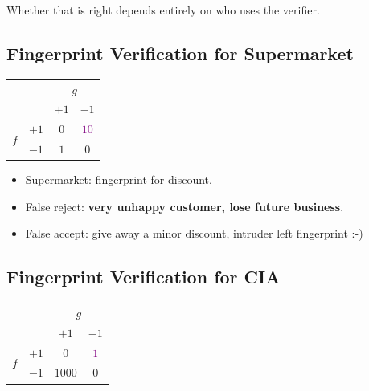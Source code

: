 Whether that is right depends entirely on who uses the verifier.

\subsection{Fingerprint Verification for Supermarket}

\begin{center}
    \solidrules
    \begin{tabular}{@{}cc|cc@{}}
        \toprule
        & & \multicolumn{2}{c}{\(g\)}\\
        & & \(+1\) & \(-1\)\\
        \midrule
        \multirow{2}{*}{\(f\)} & \(+1\) & \textcolor{black!45}{\(0\)}
        & \textcolor{Purple}{\(10\)}\\
        & \(-1\) & \textcolor{orange!85!black}{\(1\)}
        & \textcolor{black!45}{\(0\)}\\
        \bottomrule
    \end{tabular}
\end{center}

\begin{itemize}
    \item Supermarket: fingerprint for discount.
    \item False reject: \textbf{very unhappy customer, lose future business}.
    \item False accept: give away a minor discount, intruder left fingerprint
        :-)
\end{itemize}

\subsection{Fingerprint Verification for CIA}

\begin{center}
    \solidrules
    \begin{tabular}{@{}cc|cc@{}}
        \toprule
        & & \multicolumn{2}{c}{\(g\)}\\
        & & \(+1\) & \(-1\)\\
        \midrule
        \multirow{2}{*}{\(f\)} & \(+1\) & \textcolor{black!45}{\(0\)}
        & \textcolor{Purple}{\(1\)}\\
        & \(-1\) & \textcolor{orange!85!black}{\(1000\)}
        & \textcolor{black!45}{\(0\)}\\
        \bottomrule
    \end{tabular}
\end{center}

